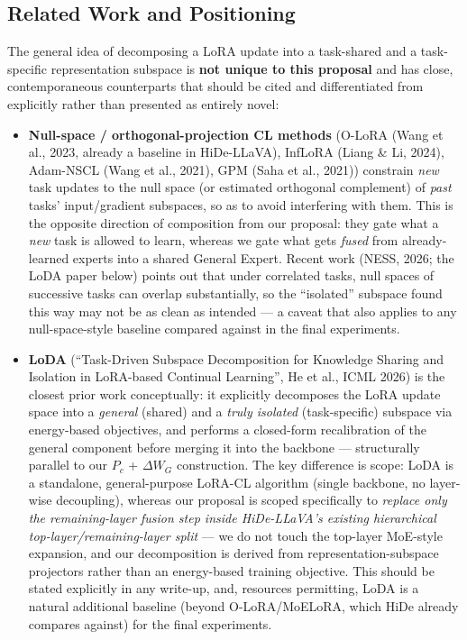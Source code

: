 \documentclass[a4paper]{article}
\begin{document}
\subsection{Related Work and Positioning}

The general idea of decomposing a LoRA update into a task-shared and a task-specific representation subspace is \textbf{not unique to this proposal} and has close, contemporaneous counterparts that should be cited and differentiated from explicitly rather than presented as entirely novel:

\begin{itemize}
\item \textbf{Null-space / orthogonal-projection CL methods} (O-LoRA (Wang et al., 2023, already a baseline in HiDe-LLaVA), InfLoRA (Liang \& Li, 2024), Adam-NSCL (Wang et al., 2021), GPM (Saha et al., 2021)) constrain \emph{new} task updates to the null space (or estimated orthogonal complement) of \emph{past} tasks' input/gradient subspaces, so as to avoid interfering with them. This is the opposite direction of composition from our proposal: they gate what a \emph{new} task is allowed to learn, whereas we gate what gets \emph{fused} from already-learned experts into a shared General Expert. Recent work (NESS, 2026; the LoDA paper below) points out that under correlated tasks, null spaces of successive tasks can overlap substantially, so the ``isolated'' subspace found this way may not be as clean as intended — a caveat that also applies to any null-space-style baseline compared against in the final experiments.
\item \textbf{LoDA} (``Task-Driven Subspace Decomposition for Knowledge Sharing and Isolation in LoRA-based Continual Learning'', He et al., ICML 2026) is the closest prior work conceptually: it explicitly decomposes the LoRA update space into a \emph{general} (shared) and a \emph{truly isolated} (task-specific) subspace via energy-based objectives, and performs a closed-form recalibration of the general component before merging it into the backbone — structurally parallel to our $P_c$ + $\Delta W_G$ construction. The key difference is scope: LoDA is a standalone, general-purpose LoRA-CL algorithm (single backbone, no layer-wise decoupling), whereas our proposal is scoped specifically to \emph{replace only the remaining-layer fusion step inside HiDe-LLaVA's existing hierarchical top-layer/remaining-layer split} — we do not touch the top-layer MoE-style expansion, and our decomposition is derived from representation-subspace projectors rather than an energy-based training objective. This should be stated explicitly in any write-up, and, resources permitting, LoDA is a natural additional baseline (beyond O-LoRA/MoELoRA, which HiDe already compares against) for the final experiments.

\end{itemize}
\end{document}
